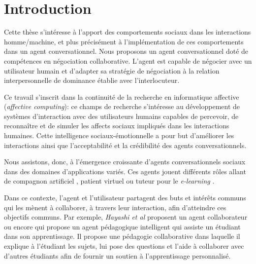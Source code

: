 \chapter{Introduction}


Cette thèse s'intéresse à l'apport des comportements sociaux dans les interactions homme/machine, et plus précisément à l'implémentation de ces comportements dans un agent conversationnel. Nous proposons un agent conversationnel doté de compétences en négociation collaborative. L'agent est capable de négocier avec un utilisateur humain et d'adapter sa stratégie de négociation à la relation interpersonnelle de dominance établie avec l'interlocuteur. 


Ce travail s'inscrit dans la continuité de la recherche en informatique affective (\emph{affective computing}): ce champs de recherche s'intéresse au développement de systèmes d'interaction avec des utilisateurs humains capables de percevoir, de reconnaître et de simuler les affects sociaux impliqués dans les interactions humaines. Cette intelligence sociaux-émotionnelle a pour but d'améliorer les interactions ainsi que l'acceptabilité et la crédibilité des agents conversationnels. 

Nous assistons, donc, à l'émergence croissante d'agents conversationnels sociaux dans des domaines d'applications variés.  Ces agents jouent différents rôles allant de compagnon artificiel \cite{ring2013addressing,sidner2013always}, patient virtuel\cite{kenny2007virtual,kleinheksel2017virtual} ou tuteur pour le \emph{e-learning} \cite{kerly2008calmsystem,kerry2009conversational}.

 Dans ce contexte, l'agent et l'utilisateur partagent des buts et intérêts communs qui les mènent à collaborer, à travers leur interaction, afin d'atteindre ces objectifs communs. 
Par exemple, \emph{Hayashi et al} proposent un agent collaborateur \cite{hayashi2013embodied} ou encore \cite{soliman2010intelligent} qui propose un agent pédagogique intelligent qui assiste un étudiant dans son apprentissage. Il propose une pédagogie collaborative dans laquelle il explique à l'étudiant les sujets, lui pose des questions et l'aide à collaborer avec d'autres étudiants afin de fournir un soutien à l'apprentissage personnalisé.

